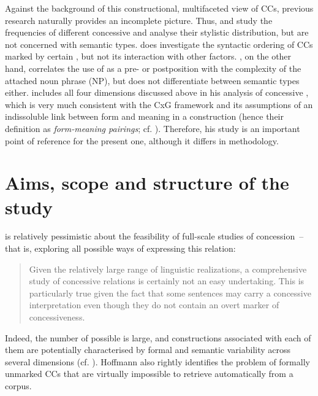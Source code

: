 Against the background of this constructional, multifaceted view of CCs, previous research naturally provides an incomplete picture. Thus, \citet{Aarts1988} and \citet{Hoffmann2005} study the frequencies of different concessive  and analyse their stylistic distribution, but are not concerned with semantic types. \citet{Aarts1988} does investigate the syntactic ordering of CCs marked by certain , but not its interaction with other factors. \citet{Berlage2009}, on the other hand, correlates the use of  as a pre- or postposition with the complexity of the attached noun phrase (NP), but does not differentiate between semantic types either. \citet{Hilpert2013a} includes all four dimensions discussed above in his analysis of concessive , which is very much consistent with the CxG framework and its assumptions of an indissoluble link between form and meaning in a construction (hence their definition as \textit{form-meaning pairings}; cf. \citealt{Goldberg2003}). Therefore, his study is an important point of reference for the present one, although it differs in methodology.

\section{\label{bkm:Ref495941783}Aims, scope and structure of the study}\label{sec:1.3}

\citet[111]{Hoffmann2005} is relatively pessimistic about the feasibility of full-scale studies of concession~– that is,  exploring all possible ways of expressing this relation:

\begin{quote}
Given the relatively large range of linguistic realizations, a comprehensive study of concessive relations is certainly not an easy undertaking. This is particularly true given the fact that some sentences may carry a concessive interpretation even though they do not contain an overt marker of concessiveness.
\end{quote}

Indeed, the number of possible  is large, and constructions associated with each of them are potentially characterised by formal and semantic variability across several dimensions (cf. ). Hoffmann also rightly identifies the problem of formally unmarked CCs that are virtually impossible to retrieve automatically from a corpus.

